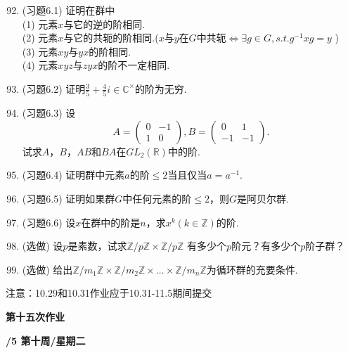 \documentclass[a4paper,12pt]{article}
\begin{document}
\begin{enumerate}\setcounter{enumi}{91}

    \item (习题6.1) 证明在群中\\
    (1) 元素$x$与它的逆的阶相同.\\
    (2) 元素$x$与它的共轭的阶相同.($x$与$y$在$G$中共轭$\iff \exists g\in G, s.t. g^{-1} x g=y$ )\\
    (3) 元素$xy$与$yx$的阶相同.\\
    (4) 元素$xyz$与$zyx$的阶不一定相同.

    \item (习题6.2) 证明$\frac{3}{5}+\frac{4}{5} i \in \mathbb{C}^{\times}$的阶为无穷.

    \item (习题6.3) 设
    $$ A=\begin{pmatrix}0&-1\\1&0\end{pmatrix}, B=\begin{pmatrix}0&1\\-1&-1\end{pmatrix}. $$
    试求$A$，$B$，$AB$和$BA$在$GL_2(\mathbb{R})$中的阶.

    \item (习题6.4) 证明群中元素$a$的阶$\leq 2$当且仅当$a=a^{-1}$.

    \item (习题6.5) 证明如果群$G$中任何元素的阶$\leq 2$，则$G$是阿贝尔群.

    \item (习题6.6) 设$x$在群中的阶是$n$，求$x^k(k\in \mathbb{Z})$的阶.

    \item {\color{red} (选做)} 设$p$是素数，试求$\mathbb{Z}/p\mathbb{Z} \times \mathbb{Z}/p\mathbb{Z}$ 有多少个$p$阶元？有多少个$p$阶子群？

    \item {\color{red} (选做)} 给出$\mathbb{Z}/m_1\mathbb{Z} \times \mathbb{Z}/m_2\mathbb{Z} \times \dots
    \times \mathbb{Z}/m_n\mathbb{Z}$为循环群的充要条件.

\end{enumerate}

{\color{red} 注意：10.29和10.31作业应于10.31-11.5期间提交}


\newpage
\head

\begin{center} %
	{\Large \bf 第十五次作业} %
	\vspace{2mm}
	
	{\bf{}/5 \quad  第十周/星期二} %
\end{center} 
\end{document}
